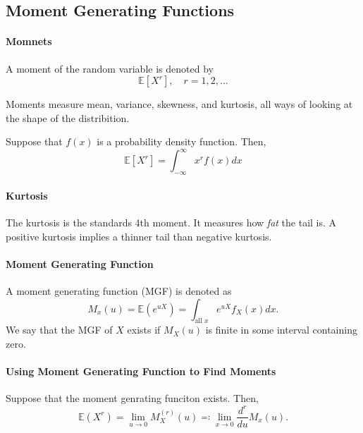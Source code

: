 \subsection{Moment Generating Functions}

\paragraph{Momnets}
A moment of the random variable is denoted by
\[ 
    \mathbb{E}[X^r], \quad r = 1, 2, \dots
\]

Moments measure mean, variance, skewness, and kurtosis, all ways of
looking at the shape of the distribition.

Suppose that \(f(x)\) is a probability density function. Then,
\[
    \mathbb{E}[X^r] = \int_{-\infty}^{\infty} x^r f(x)dx
\]


\paragraph{Kurtosis}
The kurtosis is the standards 4th moment. It measures how \textit{fat}
the tail is. A positive kurtosis implies a thinner tail than negative
kurtosis.

\paragraph{Moment Generating Function}
A moment generating function (MGF) is denoted as
\[
    M_x(u) = \mathbb{E}(e^{uX})
    = \int_{\text{all } x} e^{uX} f_X(x)dx.
\]
We say that the MGF of \(X\) exists if \(M_X(u)\) is finite
in some interval containing zero.

\paragraph{Using Moment Generating Function to Find Moments}
Suppose that the moment genrating funciton exists. Then,
\[
    \mathbb{E}(X^r)
    = \lim_{u\to 0} M_X^(r)(u)
    \eqqcolon \lim_{x\to 0} \frac{d^r}{d u} M_x(u) .
\]
